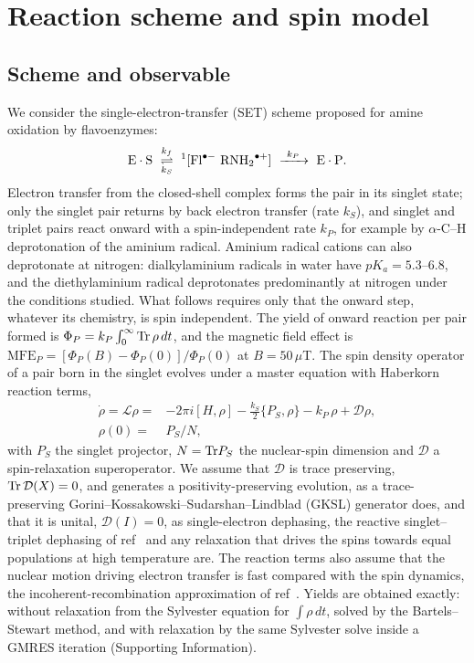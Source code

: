 \documentclass[aip,jcp,amsmath,amssymb,reprint]{revtex4-1}
\begin{document}
\section{Reaction scheme and spin model}

\subsection{Scheme and observable}

We consider the single-electron-transfer (SET) scheme proposed for amine
oxidation by flavoenzymes:\cite{Edmondson2007}
\begin{equation}
{\rm E\cdot S}\ \underset{k_S}{\overset{k_f}{\rightleftharpoons}}\
{}^1[{\rm Fl}^{\bullet-}\ {\rm RNH_2}^{\bullet+}]
\ \xrightarrow{\ k_P\ }\ {\rm E\cdot P}.
\label{eq:scheme}
\end{equation}
Electron transfer from the closed-shell complex forms the pair in its singlet
state; only the singlet pair returns by back electron transfer (rate $k_S$), and
singlet and triplet pairs react onward with a spin-independent rate $k_P$, for
example by $\alpha$-C--H deprotonation of the aminium radical. Aminium radical
cations can also deprotonate at nitrogen: dialkylaminium radicals in water have
$pK_a = 5.3$--6.8, and the diethylaminium radical deprotonates predominantly at
nitrogen under the conditions studied.\cite{Jonsson1996} What follows requires only that the onward step,
whatever its chemistry, is spin independent. The yield of
onward reaction per pair formed is $\Phi_P = k_P\int_0^\infty{\rm Tr}\,\rho\,dt$,
and the magnetic field effect is
$\mathrm{MFE}_P = [\Phi_P(B)-\Phi_P(0)]/\Phi_P(0)$ at $B=50\,\mu$T. The spin
density operator of a pair born in the singlet evolves under a master equation
with Haberkorn reaction terms,\cite{Haberkorn1976,Fay2018}
\begin{equation}
\begin{split}
\dot\rho = \mathcal L\rho ={}& -2\pi i[H,\rho] - \tfrac{k_S}{2}\{P_S,\rho\} - k_P\,\rho
+ \mathcal D\rho ,\\
\rho(0) ={}& P_S/N ,
\end{split}
\label{eq:me}
\end{equation}
with $P_S$ the singlet projector, $N = {\rm Tr}P_S$ the nuclear-spin dimension and
$\mathcal D$ a spin-relaxation superoperator. We assume that $\mathcal D$
is trace preserving, ${\rm Tr}\,\mathcal D(X)=0$, and generates a
positivity-preserving evolution, as a trace-preserving
Gorini--Kossakowski--Sudarshan--Lindblad (GKSL)
generator\cite{Gorini1976,Lindblad1976} does, and that it is
unital, $\mathcal D(I)=0$, as single-electron dephasing, the reactive
singlet--triplet dephasing of ref~\citenum{Fay2018} and any relaxation that
drives the spins towards equal populations at high temperature are. The
reaction terms also assume that the nuclear motion driving electron transfer is
fast compared with the spin dynamics, the incoherent-recombination approximation
of ref~\citenum{Fay2018}. Yields are obtained exactly: without relaxation from
the Sylvester equation for $\int\rho\,dt$, solved by the Bartels--Stewart
method,\cite{Bartels1972} and with relaxation by the same Sylvester solve inside
a GMRES iteration\cite{Saad1986} (Supporting Information).
\end{document}
